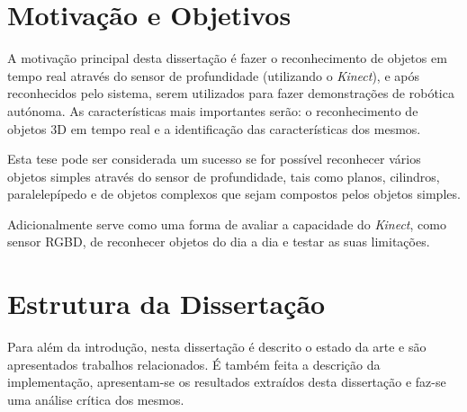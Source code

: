 \section{Motivação e Objetivos} \label{sec:goals}


A motivação principal desta dissertação é fazer o reconhecimento de objetos em tempo real através do sensor de profundidade (utilizando o \emph{Kinect}), e após reconhecidos pelo sistema, serem utilizados para fazer demonstrações de robótica autónoma. As características mais importantes serão: o reconhecimento de objetos 3D em tempo real e a identificação das características dos mesmos.

Esta tese pode ser considerada um sucesso se for possível  reconhecer vários objetos simples através do sensor de profundidade, tais como planos, cilindros, paralelepípedo e de objetos complexos que sejam compostos pelos objetos simples.

Adicionalmente serve como uma forma de avaliar a capacidade do \emph{Kinect}, como sensor RGBD, de reconhecer objetos do dia a dia e testar as suas limitações.


\section{Estrutura da Dissertação} \label{sec:struct}

Para além da introdução, nesta dissertação é descrito o estado da arte e são apresentados trabalhos relacionados. É também feita a descrição da implementação, apresentam-se os resultados extraídos desta dissertação e faz-se uma análise crítica dos mesmos.
